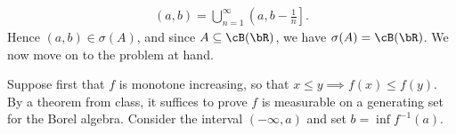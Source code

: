 \begin{homework}[e]
\begin{prf}
		\begin{align*}
			(a,b) = \bigcup_{n=1}^\infty \left(a,b - \frac{1}{n}\right].
		\end{align*}
		Hence $(a,b) \in \sigma(A)$, and since $A \subseteq \cB(\bR)$, we have $\sigma(A) = \cB(\bR)$. We now move on to the problem at hand.
		
		Suppose first that $f$ is monotone increasing, so that $x \leq y\implies f(x) \leq f(y)$. By a theorem from class, it suffices to prove $f$ is measurable on a generating set for the Borel algebra. Consider the interval $(-\infty,a)$ and set $b = \inf f^{-1}(a)$. 
	\end{prf}
\end{homework}

